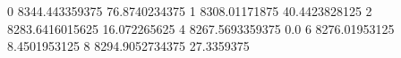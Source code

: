 0 8344.443359375 76.8740234375
1 8308.01171875 40.4423828125
2 8283.6416015625 16.072265625
4 8267.5693359375 0.0
6 8276.01953125 8.4501953125
8 8294.9052734375 27.3359375
